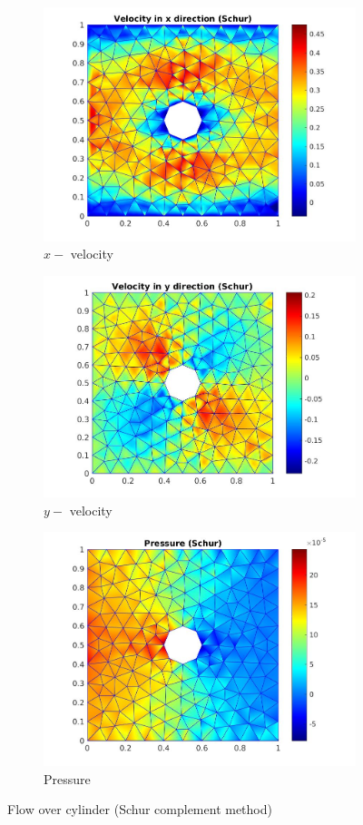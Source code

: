 \documentclass[a4paper,openany]{book}
\begin{document}
\begin{figure}
\begin{subfigure}{\textwidth}	
    \includegraphics[width=0.8\linewidth]{cylinder_schur_vx.jpg}
    \caption{$x-$ velocity}
    \label{x_vel_stoke_schur}
\end{subfigure}
\begin{subfigure}{\textwidth}	
    \includegraphics[width=0.8\linewidth]{cylinder_schur_vy.jpg}
    \caption{$y-$ velocity}
     \label{y_vel_stoke_schur}
\end{subfigure}
\begin{subfigure}{\textwidth}	
    \includegraphics[width=0.8\linewidth]{cylinder_schur_pressure.jpg}
    \caption{Pressure}
      \label{pressure_stoke_schur}
\end{subfigure}
\caption{Flow over cylinder (Schur complement method)}
\label{flow_over_cylinder_schur}
\end{figure}
\end{document}
